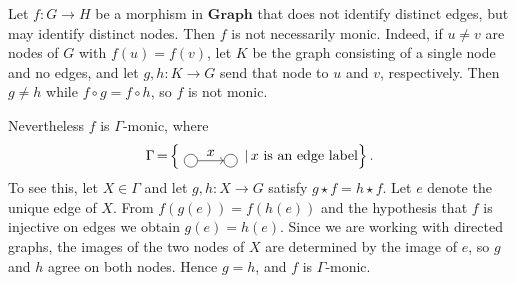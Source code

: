 \begin{example}
 
 Let \(f\mathop{\colon} G \mathop{\to} H\) be a morphism in \(\mathbf{Graph}\) that does not identify distinct edges, but may identify distinct nodes. Then \(f\) is not necessarily monic. Indeed, if \(u\mathop{\neq} v\) are nodes of \(G\) with \(f(u)=f(v)\), let \(K\) be the graph consisting of a single node and no edges, and let \(g,h\mathop{\colon} K \mathop{\to} G\) send that node to \(u\) and \(v\), respectively. Then \(g\mathop{\neq} h\) while \(f\circ g=f\circ h\), so \(f\) is not monic.

Nevertheless \(f\) is \(\Gamma\)-monic, where
\[
\Gamma \mathop{=} \left\{ \vcenter{\hbox{
\begin{tikzpicture}[baseline=-0.5ex]
\node[draw,circle] (A) at (0,0) {};
\node[draw,circle] (B) at (1,0) {};
\draw[->] (A) -- (B) node[midway, above] {$x$};
\end{tikzpicture}
}} \mathop{\mid} x \text{ is an edge label} \right\}.
\]
To see this, let \(X\in\Gamma\) and let \(g,h\mathop{\colon} X \mathop{\to} G\) satisfy \(g \mathop{\star} f \mathop{=} h \mathop{\star} f\). Let \(e\) denote the unique edge of \(X\). From \(f(g(e))\mathop{=}f(h(e))\) and the hypothesis that \(f\) is injective on edges we obtain \(g(e)\mathop{=}h(e)\). Since we are working with directed graphs, the images of the two nodes of \(X\) are determined by the image of \(e\), so \(g\) and \(h\) agree on both nodes. Hence \(g \mathop{=} h\), and \(f\) is \(\Gamma\)-monic.

\end{example}
